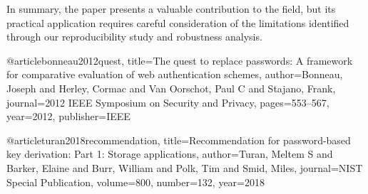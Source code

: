 \documentclass[11pt,a4paper]{article}
\begin{document}
In summary, the paper presents a valuable contribution to the field, but its practical application requires careful consideration of the limitations identified through our reproducibility study and robustness analysis.




@article{bonneau2012quest,
  title={The quest to replace passwords: A framework for comparative evaluation of web authentication schemes},
  author={Bonneau, Joseph and Herley, Cormac and Van Oorschot, Paul C and Stajano, Frank},
  journal={2012 IEEE Symposium on Security and Privacy},
  pages={553--567},
  year={2012},
  publisher={IEEE}
}

@article{turan2018recommendation,
  title={Recommendation for password-based key derivation: Part 1: Storage applications},
  author={Turan, Meltem S and Barker, Elaine and Burr, William and Polk, Tim and Smid, Miles},
  journal={NIST Special Publication},
  volume={800},
  number={132},
  year={2018}
}
\end{document}
